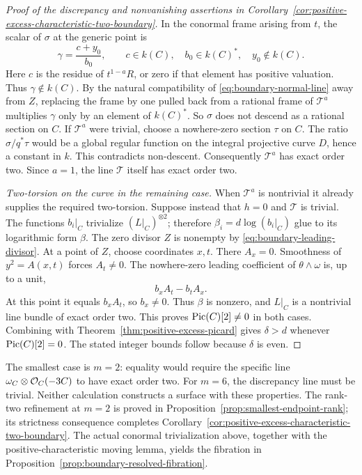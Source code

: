 \begin{proof}[Proof of the discrepancy and nonvanishing assertions in Corollary~\ref{cor:positive-excess-characteristic-two-boundary}]
In the conormal frame arising from $t$, the scalar of $\sigma$
at the generic point is
\[
 \gamma=\frac{c+y_0}{b_0},\qquad
 c\in k(C),\quad b_0\in k(C)^*,\quad y_0\notin k(C).
\]
Here $c$ is the residue of $t^{1-a}R$, or zero if that
element has positive valuation. Thus $\gamma\notin k(C)$.
By the natural compatibility of
\eqref{eq:boundary-normal-line} away from $Z$, replacing the
frame by one pulled back from a rational frame of $\mathcal T^a$
multiplies $\gamma$ only by an element of $k(C)^*$.
So $\sigma$ does not descend as a rational section on $C$.
If $\mathcal T^a$ were trivial, choose a nowhere-zero section
$\tau$ on $C$. The ratio $\sigma/q^*\tau$ would be a global
regular function on the integral projective curve $D$, hence a
constant in $k$. This contradicts non-descent. Consequently
$\mathcal T^a$ has exact order two.
Since $a=1$, the line $\mathcal T$ itself has exact order two.

\smallskip\noindent
\emph{Two-torsion on the curve in the remaining case.}
When $\mathcal T^a$ is nontrivial it already supplies the required
two-torsion. Suppose instead that $h=0$ and $\mathcal T$ is
trivial. The functions $b_i|_C$ trivialize $(L|_C)^{\otimes2}$;
therefore $\beta_i=d\log(b_i|_C)$ glue to its logarithmic form
$\beta$. The zero divisor $Z$ is nonempty by
\eqref{eq:boundary-leading-divisor}. At a point of $Z$, choose
coordinates $x,t$. There $A_x=0$. Smoothness of
$y^2=A(x,t)$ forces $A_t\ne0$. The nowhere-zero leading
coefficient of $\theta\wedge\omega$ is, up to a unit,
\[
 b_xA_t-b_tA_x.
\]
At this point it equals $b_xA_t$, so $b_x\ne0$. Thus
$\beta$ is nonzero, and $L|_C$ is a nontrivial line bundle
of exact order two. This proves $\operatorname{Pic}(C)[2]\ne0$ in both
cases. Combining with Theorem~\ref{thm:positive-excess-picard}
gives $\delta>d$ whenever $\operatorname{Pic}(C)[2]=0$.
The stated integer bounds follow because $\delta$ is even.
\end{proof}

The smallest case is $m=2$: equality would require the specific
line $\omega_C\otimes\mathcal O_C(-3C)$ to have exact order two.
For $m=6$, the discrepancy line must be trivial. Neither calculation constructs a surface with these
properties. The rank-two refinement at $m=2$ is proved in
Proposition~\ref{prop:smallest-endpoint-rank}; its strictness consequence
completes Corollary~\ref{cor:positive-excess-characteristic-two-boundary}.
The actual conormal trivialization above, together with the
positive-characteristic moving lemma, yields the fibration in
Proposition~\ref{prop:boundary-resolved-fibration}.
